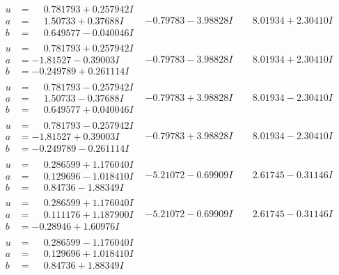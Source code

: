 \documentclass[1p]{elsarticle_modified}
\theoremstyle{definition}
\begin{document}
$$\begin{array}{c|c|c}
\begin{aligned}
u &= \phantom{-}0.781793 + 0.257942 I \\
a &= \phantom{-}1.50733 + 0.37688 I \\
b &= \phantom{-}0.649577 - 0.040046 I\end{aligned}
 & -0.79783 - 3.98828 I & \phantom{-}8.01934 + 2.30410 I \\ \hline\begin{aligned}
u &= \phantom{-}0.781793 + 0.257942 I \\
a &= -1.81527 - 0.39003 I \\
b &= -0.249789 + 0.261114 I\end{aligned}
 & -0.79783 - 3.98828 I & \phantom{-}8.01934 + 2.30410 I \\ \hline\begin{aligned}
u &= \phantom{-}0.781793 - 0.257942 I \\
a &= \phantom{-}1.50733 - 0.37688 I \\
b &= \phantom{-}0.649577 + 0.040046 I\end{aligned}
 & -0.79783 + 3.98828 I & \phantom{-}8.01934 - 2.30410 I \\ \hline\begin{aligned}
u &= \phantom{-}0.781793 - 0.257942 I \\
a &= -1.81527 + 0.39003 I \\
b &= -0.249789 - 0.261114 I\end{aligned}
 & -0.79783 + 3.98828 I & \phantom{-}8.01934 - 2.30410 I \\ \hline\begin{aligned}
u &= \phantom{-}0.286599 + 1.176040 I \\
a &= \phantom{-}0.129696 - 1.018410 I \\
b &= \phantom{-}0.84736 - 1.88349 I\end{aligned}
 & -5.21072 - 0.69909 I & \phantom{-}2.61745 - 0.31146 I \\ \hline\begin{aligned}
u &= \phantom{-}0.286599 + 1.176040 I \\
a &= \phantom{-}0.111176 + 1.187900 I \\
b &= -0.28946 + 1.60976 I\end{aligned}
 & -5.21072 - 0.69909 I & \phantom{-}2.61745 - 0.31146 I \\ \hline\begin{aligned}
u &= \phantom{-}0.286599 - 1.176040 I \\
a &= \phantom{-}0.129696 + 1.018410 I \\
b &= \phantom{-}0.84736 + 1.88349 I\end{aligned}

\end{array}$$
\end{document}
